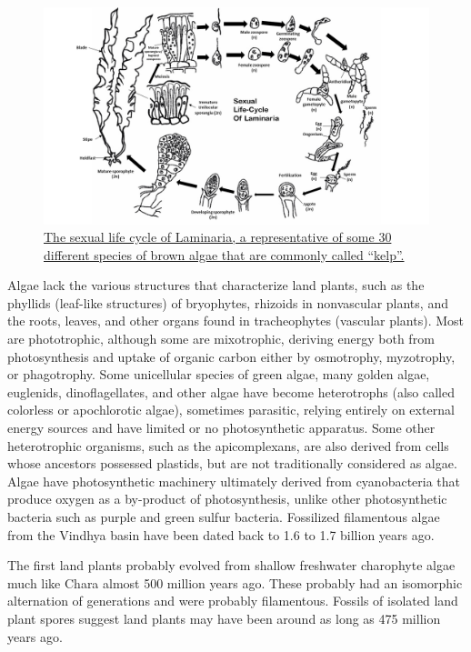 \begin{figure}

{\centering \includegraphics[width=0.7\linewidth]{./figures/protista/Laminaria_Life_Cycle} 

}

\caption{\href{https://commons.wikimedia.org/wiki/File:Laminaria_Life_Cycle.png}{The sexual life cycle of Laminaria, a representative of some 30 different species of brown algae that are commonly called ``kelp''.}}\label{fig:laminarialifecycle}
\end{figure}

Algae lack the various structures that characterize land plants, such as the phyllids (leaf-like structures) of bryophytes, rhizoids in nonvascular plants, and the roots, leaves, and other organs found in tracheophytes (vascular plants). Most are phototrophic, although some are mixotrophic, deriving energy both from photosynthesis and uptake of organic carbon either by osmotrophy, myzotrophy, or phagotrophy. Some unicellular species of green algae, many golden algae, euglenids, dinoflagellates, and other algae have become heterotrophs (also called colorless or apochlorotic algae), sometimes parasitic, relying entirely on external energy sources and have limited or no photosynthetic apparatus. Some other heterotrophic organisms, such as the apicomplexans, are also derived from cells whose ancestors possessed plastids, but are not traditionally considered as algae. Algae have photosynthetic machinery ultimately derived from cyanobacteria that produce oxygen as a by-product of photosynthesis, unlike other photosynthetic bacteria such as purple and green sulfur bacteria. Fossilized filamentous algae from the Vindhya basin have been dated back to 1.6 to 1.7 billion years ago.

The first land plants probably evolved from shallow freshwater charophyte algae much like Chara almost 500 million years ago. These probably had an isomorphic alternation of generations and were probably filamentous. Fossils of isolated land plant spores suggest land plants may have been around as long as 475 million years ago.

